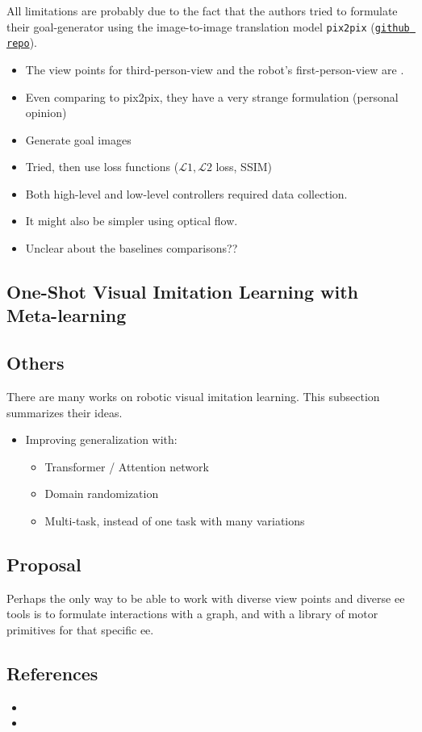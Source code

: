  All limitations are probably due to the fact that the authors tried to formulate their goal-generator using the image-to-image translation model \texttt{pix2pix} (\href{https://github.com/pathak22/hierarchical-imitation}{\texttt{github repo}}).
\begin{itemize}
	\item The view points for third-person-view and the robot's first-person-view are .
	\item Even comparing to pix2pix, they have a very strange formulation (personal opinion)
	\item Generate  goal images
	\item Tried, then use  loss functions ($ \mathcal{L}1, \mathcal{L}2 $ loss, \ac{SSIM})
	\item Both high-level and low-level controllers required  data collection.
	\item It might also be simpler using optical flow.
	\item Unclear about the baselines comparisons?? 
\end{itemize}

\subsection{One-Shot Visual Imitation Learning with Meta-learning}
 

\subsection{Others}
There are many works on robotic visual imitation learning. This subsection summarizes their ideas.
\begin{itemize}
	\item Improving generalization with:
	\begin{itemize}
		\item Transformer / Attention network \cite{dasari2020transformers}
		\item Domain randomization \cite{zhou2021manipulator}
		\item Multi-task, instead of one task with many variations \cite{mandi2022towards}
	\end{itemize}
\end{itemize}

\subsection{Proposal}
Perhaps the only way to be able to work with diverse view points and diverse \ac{ee} tools is to formulate interactions with a graph, and with a library of motor primitives for that specific \ac{ee}.

\subsection{References}
\begin{itemize}
	\item {}
	\item {}
\end{itemize}
